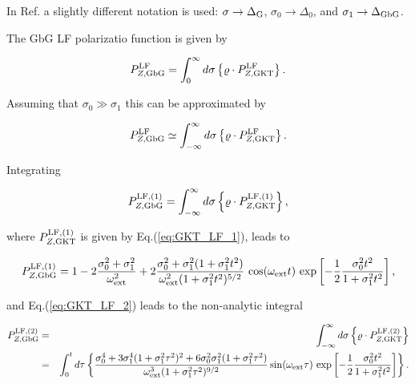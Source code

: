 \documentclass[twoside]{article}
\begin{document}
\noindent In Ref.\cite{yaouanc2011} a slightly different notation is used: $\sigma \to \Delta_{\rm G}$,  $\sigma_0 \to \Delta_{0}$, and 
$\sigma_1 \to \Delta_{\rm GbG}$.

\noindent The GbG LF polarizatio function is given by

\begin{equation}
 P_{Z,{\rm GbG}}^{\rm LF} = \int_0^\infty d\sigma \left\{ \varrho \cdot P_{Z,{\rm GKT}}^{\rm LF} \right\}.
\end{equation}

\noindent Assuming that $\sigma_0 \gg \sigma_1$ this can be approximated by

\begin{equation}
 P_{Z,{\rm GbG}}^{\rm LF} \simeq \int_{-\infty}^\infty d\sigma \left\{ \varrho \cdot P_{Z,{\rm GKT}}^{\rm LF} \right\}.
\end{equation}

\noindent Integrating 

\begin{equation*}
 P_{Z,{\rm GbG}}^{\rm LF, (1)} = \int_{-\infty}^\infty d\sigma \left\{ \varrho \cdot P_{Z,{\rm GKT}}^{\rm LF, (1)} \right\},  
\end{equation*}

\noindent where $P_{Z,{\rm GKT}}^{\rm LF, (1)}$ is given by Eq.(\ref{eq:GKT_LF_1}), leads to 

\begin{equation}\label{eq:GbG_LF_1}
 P_{Z,{\rm GbG}}^{\rm LF, (1)} = 1 - 2 \frac{\sigma_0^2+\sigma_1^2}{\omega_{\rm ext}^2} + 
      2 \frac{\sigma_0^2 + \sigma_1^2 (1 + \sigma_1^2 t^2)}{\omega_{\rm ext}^2 (1 + \sigma_1^2 t^2)^{5/2}}\, \cos(\omega_{\rm ext} t)\,
      \exp\left[-\frac{1}{2} \frac{\sigma_0^2 t^2}{1+\sigma_1^2 t^2}\right],
\end{equation}

\noindent and Eq.(\ref{eq:GKT_LF_2}) leads to the non-analytic integral

\begin{eqnarray}
  P_{Z,{\rm GbG}}^{\rm LF, (2)} &=& \int_{-\infty}^\infty d\sigma \left\{ \varrho \cdot P_{Z,{\rm GKT}}^{\rm LF, (2)} \right\} \nonumber \\
    &=& \int_0^t d\tau \left\{ \frac{\sigma_0^4 + 3 \sigma_1^4 (1 + \sigma_1^2 \tau^2)^2 + 6 \sigma_0^2 \sigma_1^2 (1+\sigma_1^2 \tau^2)}{\omega_{\rm ext}^3 (1+\sigma_1^2 \tau^2)^{9/2}} 
   \sin(\omega_{\rm ext} \tau)\, \exp\left[-\frac{1}{2} \frac{\sigma_0^2 t^2}{1+\sigma_1^2 t^2}\right] \right\}. \label{eq:GbG_LF_2}
\end{eqnarray}
\end{document}
